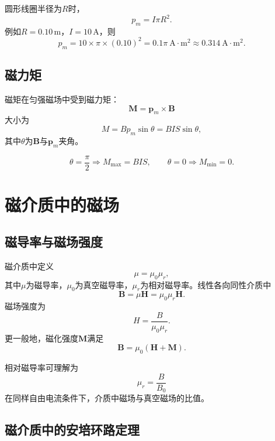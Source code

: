 \documentclass[UTF8,zihao=-4]{ctexart}
\newcommand{\muz}{\mu_0}
\newcommand{\mur}{\mu_r}
\newcommand{\ve}[1]{\bm{#1}}
\newcommand{\B}{\ve B}
\newcommand{\Hf}{\ve H}
\begin{document}
圆形线圈半径为\(R\)时，
\begin{equation}
 p_m=I\pi R^2.
\end{equation}
例如\(R=0.10\,\mathrm m\)，\(I=10\,\mathrm A\)，则
\[
 p_m=10\times\pi\times(0.10)^2=0.1\pi\ \mathrm{A\cdot m^2}\approx0.314\ \mathrm{A\cdot m^2}.
\]

\subsection{磁力矩}

磁矩在匀强磁场中受到磁力矩：
\begin{equation}
\boxed{\ve M=\ve p_m\times\B}
\end{equation}
大小为
\begin{equation}
M=Bp_m\sin\theta=BIS\sin\theta,
\end{equation}
其中\(\theta\)为\(\B\)与\(\ve p_m\)夹角。

\[
\theta=\frac{\pi}{2}\Rightarrow M_{\max}=BIS,
\qquad
\theta=0\Rightarrow M_{\min}=0.
\]

\section{磁介质中的磁场}

\subsection{磁导率与磁场强度}

磁介质中定义
\begin{equation}
\mu=\muz\mur,
\end{equation}
其中\(\mu\)为磁导率，\(\muz\)为真空磁导率，\(\mur\)为相对磁导率。线性各向同性介质中
\begin{equation}
\boxed{\B=\mu\Hf=\muz\mur\Hf}.
\end{equation}
磁场强度为
\begin{equation}
H=\frac{B}{\muz\mur}.
\end{equation}
更一般地，磁化强度\(\ve M\)满足
\begin{equation}
\B=\muz(\Hf+\ve M).
\end{equation}

相对磁导率可理解为
\begin{equation}
\mur=\frac{B}{B_0}
\end{equation}
在同样自由电流条件下，介质中磁场与真空磁场的比值。

\subsection{磁介质中的安培环路定理}
\end{document}
